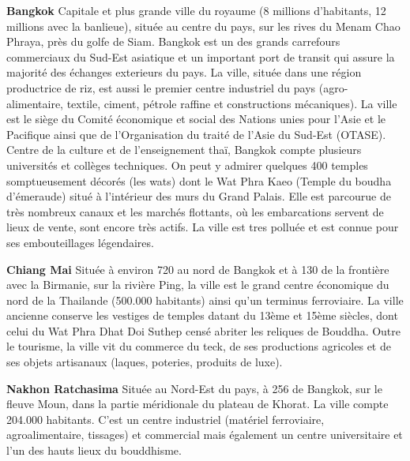 \begin{multicols}{2}
\textbf{Bangkok}
Capitale et plus grande ville du royaume (8 millions d’habitants, 12 millions avec la banlieue), située au centre du pays, sur les rives du Menam Chao Phraya, près du golfe de Siam. Bangkok est un des grands carrefours commerciaux du Sud-Est asiatique et un important port de transit qui assure la majorité des échanges exterieurs du pays. La ville, située dans une région productrice de riz, est aussi le premier centre industriel du pays (agro-alimentaire, textile, ciment, pétrole raffine et constructions mécaniques). La ville est le siège du Comité économique et social des Nations unies pour l’Asie et le Pacifique ainsi que de l’Organisation du traité de l’Asie du Sud-Est (OTASE). Centre de la culture et de l’enseignement thaï, Bangkok compte plusieurs universités et collèges techniques. On peut y admirer quelques 400 temples somptueusement décorés (les wats) dont le Wat Phra Kaeo (Temple du boudha d’émeraude) situé à l’intérieur des murs du Grand Palais. Elle est parcourue de très nombreux canaux et les marchés flottants, où les embarcations servent de lieux de vente, sont encore très actifs. La ville est tres polluée et est connue pour ses embouteillages légendaires.

\textbf{Chiang Mai}
Située à environ 720 \kilo\meter au nord de Bangkok et à 130 \kilo\meter de la frontière avec la Birmanie, sur la rivière Ping, la ville est le grand centre économique du nord de la Thailande (500.000 habitants) ainsi qu’un terminus ferroviaire. La ville ancienne conserve les vestiges de temples datant du 13ème et 15ème siècles, dont celui du Wat Phra Dhat Doi Suthep censé abriter les reliques de Bouddha. Outre le tourisme, la ville vit du commerce du teck, de ses productions agricoles et de ses objets artisanaux (laques, poteries, produits de luxe).

\textbf{Nakhon Ratchasima}
Située au Nord-Est du pays, à 256 \kilo\meter de Bangkok, sur le fleuve Moun, dans la partie méridionale du plateau de Khorat. La ville compte 204.000 habitants. C’est un centre industriel (matériel ferroviaire, agroalimentaire, tissages) et commercial mais également un centre universitaire et l’un des hauts lieux du bouddhisme.

\end{multicols}
